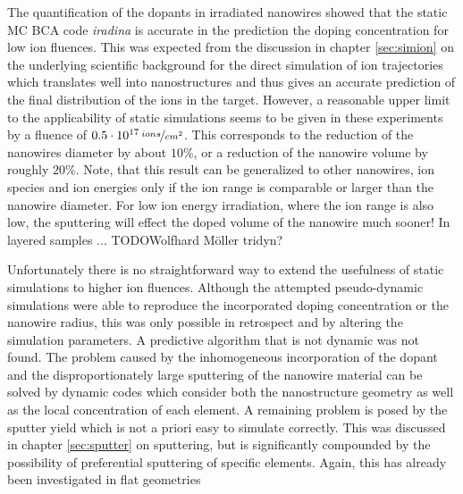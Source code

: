 The quantification of the dopants in irradiated nanowires showed that the static MC BCA code \emph{iradina} is accurate in the prediction the doping concentration for low ion fluences. This was expected from the discussion in chapter \ref{sec:simion} on the underlying scientific background for the direct simulation of ion trajectories which translates well into nanostructures and thus gives an accurate prediction of the final distribution of the ions in the target. However, a reasonable upper limit to the applicability of static simulations seems to be given in these experiments by a fluence of $0.5\cdot 10^{17}\,\nicefrac{ions}{cm^2}$. This corresponds to the reduction of the nanowires diameter by about $10\%$, or a reduction of the nanowire volume by roughly $20\%$. Note, that this result can be generalized to other nanowires, ion species and ion energies only if the ion range is comparable or larger than the nanowire diameter. For low ion energy irradiation, where the ion range is also low, the sputtering will effect the doped volume of the nanowire much sooner! In layered samples ...  TODO{Wolfhard Möller tridyn?} \cite{}

Unfortunately there is no straightforward way to extend the usefulness of static simulations to higher ion fluences. Although the attempted pseudo-dynamic simulations were able to reproduce the incorporated doping concentration or the nanowire radius, this was only possible in retrospect and by altering the simulation parameters. A predictive algorithm that is not dynamic was not found. The problem caused by the inhomogeneous incorporation of the dopant and the disproportionately large sputtering of the nanowire material can be solved by dynamic codes which consider both the nanostructure geometry as well as the local concentration of each element. A remaining problem is posed by the sputter yield which is not a priori easy to simulate correctly. This was discussed in chapter \ref{sec:sputter} on sputtering, but is significantly compounded by the possibility of preferential sputtering of specific elements. Again, this has already been investigated in flat geometries \TODO{ \cite{}}
